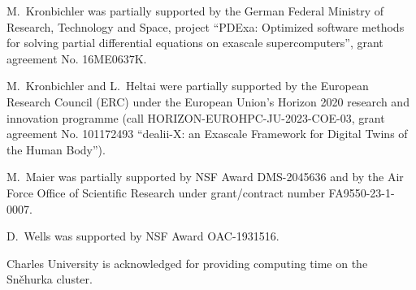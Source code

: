 \documentclass{ansarticle-preprint}
\begin{document}
M.~Kronbichler was partially supported by the
German Federal Ministry of Research, Technology and Space, project
``PDExa: Optimized software methods for solving partial differential
equations on exascale supercomputers'', grant agreement No. 16ME0637K.

M.~Kronbichler and L.~Heltai were partially supported by the European Research
Council (ERC) under the European Union's Horizon 2020 research and innovation
programme (call HORIZON-EUROHPC-JU-2023-COE-03, grant agreement No. 101172493
``dealii-X: an Exascale Framework for Digital Twins of the Human Body'').

M.~Maier was partially supported by NSF Award DMS-2045636 and by the
Air Force Office of Scientific Research under grant/contract number
FA9550-23-1-0007.

D.~Wells was supported by NSF Award OAC-1931516.

Charles University is acknowledged for providing computing time on the Sn\v{e}hurka cluster.

{}

\end{document}
